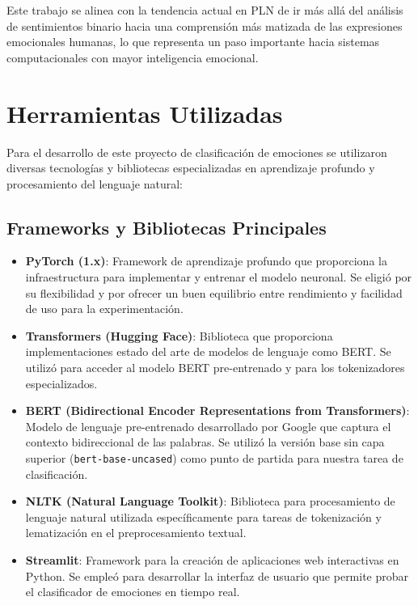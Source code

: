 \documentclass[12pt,a4paper]{report}
\begin{document}
Este trabajo se alinea con la tendencia actual en PLN de ir más allá del análisis de sentimientos binario hacia una comprensión más matizada de las expresiones emocionales humanas, lo que representa un paso importante hacia sistemas computacionales con mayor inteligencia emocional.

\section{Herramientas Utilizadas}

Para el desarrollo de este proyecto de clasificación de emociones se utilizaron diversas tecnologías y bibliotecas especializadas en aprendizaje profundo y procesamiento del lenguaje natural:

\subsection{Frameworks y Bibliotecas Principales}

\begin{itemize}
  \item \textbf{PyTorch (1.x)}: Framework de aprendizaje profundo que proporciona la infraestructura para implementar y entrenar el modelo neuronal. Se eligió por su flexibilidad y por ofrecer un buen equilibrio entre rendimiento y facilidad de uso para la experimentación.

  \item \textbf{Transformers (Hugging Face)}: Biblioteca que proporciona implementaciones estado del arte de modelos de lenguaje como BERT. Se utilizó para acceder al modelo BERT pre-entrenado y para los tokenizadores especializados.

  \item \textbf{BERT (Bidirectional Encoder Representations from Transformers)}: Modelo de lenguaje pre-entrenado desarrollado por Google que captura el contexto bidireccional de las palabras. Se utilizó la versión base sin capa superior (\texttt{bert-base-uncased}) como punto de partida para nuestra tarea de clasificación.

  \item \textbf{NLTK (Natural Language Toolkit)}: Biblioteca para procesamiento de lenguaje natural utilizada específicamente para tareas de tokenización y lematización en el preprocesamiento textual.

  \item \textbf{Streamlit}: Framework para la creación de aplicaciones web interactivas en Python. Se empleó para desarrollar la interfaz de usuario que permite probar el clasificador de emociones en tiempo real.
\end{itemize}
\end{document}
